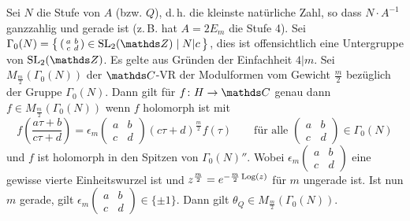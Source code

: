 Sei $N$ die Stufe von $A$ (bzw. $Q$), d.\,h. die kleinste natürliche Zahl, so dass $N \cdot A^{-1}$ ganzzahlig und gerade ist (z.\,B. hat $A = 2E_m$ die Stufe 4).
Sei $\Gamma_0(N) = \Set{(\begin{smallmatrix}a&b\\c&d\end{smallmatrix}) \in \SL_2(\ZZ) \mid N|c}$, dies ist offensichtlich eine Untergruppe von $\SL_2(\ZZ)$.
Es gelte aus Gründen der Einfachheit $4|m$.
Sei $M_{\frac{m}{2}}(\Gamma_0(N))$ der $\CC$-VR der Modulformen vom Gewicht $\frac{m}{2}$ bezüglich der Gruppe $\Gamma_0(N)$.
Dann gilt für $f\colon H \ra \CC$ genau dann  $f \in M_{\frac{m}{2}}(\Gamma_0(N))$ wenn $f$ holomorph ist mit
\[
	f\left(\frac{a\tau + b}{c\tau + d}\right) = \epsilon_m \begin{pmatrix}a&b\\c&d\end{pmatrix} (c\tau + d)^{\frac{m}{2}} f(\tau)
	\qquad \text{für alle } \begin{pmatrix}a&b\\c&d\end{pmatrix} \in \Gamma_0(N)
\]
und $f$ ist holomorph in den Spitzen von $\Gamma_0(N)''$.
Wobei $\epsilon_m (\begin{smallmatrix}a&b\\c&d\end{smallmatrix})$ eine gewisse vierte Einheitswurzel ist und $z^{\frac{m}{2}} = e^{-\frac{m}{2}\operatorname{Log}(z)}$ für $m$ ungerade ist.
Ist nun $m$ gerade, gilt $\epsilon_m (\begin{smallmatrix}a&b\\c&d\end{smallmatrix}) \in \{\pm1\}$.
Dann gilt $\theta_Q \in M_\frac{m}{2}(\Gamma_0(N))$.

